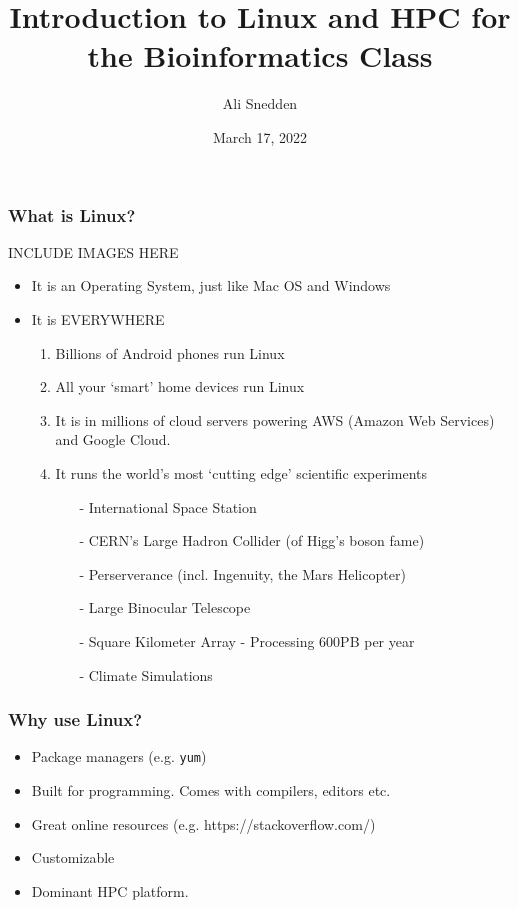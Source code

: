 \documentclass{beamer}
\title{Introduction to Linux and HPC for the Bioinformatics Class}
\author{Ali Snedden}
\institute{Nationwide Children's Hospital}
\date{March 17, 2022}
\newcommand{\code}[1]{\colorbox{codegray}{\texttt{#1}}}
\begin{document}
 
\frame{\titlepage}

\begin{frame}
\frametitle{What is Linux?}
INCLUDE IMAGES HERE
\begin{itemize}
    \item It is an Operating System, just like Mac OS and Windows  
    \pause 
    \item It is EVERYWHERE
    \begin{enumerate}
        \item Billions of Android phones run Linux
        \pause 
        \item All your `smart' home devices run Linux
        \pause 
        \item It is in millions of cloud servers powering AWS (Amazon Web Services) and Google Cloud.
        \pause 
        \item It runs the world's most `cutting edge' scientific experiments
        \begin{itemize}
            \item[-] International Space Station
            \pause
            \item[-] CERN's Large Hadron Collider (of Higg's boson fame)
            \pause
            \item[-] Perserverance (incl. Ingenuity, the Mars Helicopter)
            \pause
            \item[-] Large Binocular Telescope
            \pause
            \item[-] Square Kilometer Array - Processing 600PB per year
            \pause
            \item[-] Climate Simulations 
            \pause
        \end{itemize}
    \end{enumerate}
\end{itemize}
\end{frame}


\begin{frame}
\frametitle{Why use Linux?}
\begin{itemize}
    \item Package managers (e.g. \code{yum})
    \bigskip
    \item Built for programming. Comes with compilers, editors etc.
    \bigskip
    \item Great online resources (e.g. https://stackoverflow.com/)
    \bigskip
    \item Customizable
    \bigskip
    \item Dominant HPC platform.
\end{itemize}
\end{frame}
 
\end{document}
